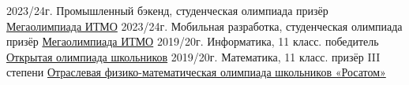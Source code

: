 \documentclass[9pt]{developercv} %
\begin{document}
\vspace{-20 pt}
\begin{entrylist}
    \entry
        {2023/24г.}
        {Промышленный бэкенд, студенческая олимпиада}
        {призёр}
        {\href{https://drive.google.com/file/d/1YQdVSubT0tgrUXBRzmaYQZjn4SfmLXu-/view}{Мегаолимпиада ИТМО}}
    \entry
        {2023/24г.}
        {Мобильная разработка, студенческая олимпиада}
        {призёр}
        {\href{https://drive.google.com/file/d/1yrZl55YZbbO_mYd815QeP8cv3__eWc_P/view}{Мегаолимпиада ИТМО}}
    \entry
		{2019/20г.}
        {Информатика, 11 класс.}
        {победитель}
        {\href{https://diploma.rsr-olymp.ru/files/rsosh-diplomas-static/compiled-storage-2020/by-code/184635984832/color.pdf}{Открытая олимпиада школьников}}
    \entry
		{2019/20г.}
        {Математика, 11 класс.}
        {призёр III степени}
		{\href{https://diploma.rsr-olymp.ru/files/rsosh-diplomas-static/compiled-storage-2020/by-code/186308281722/color.pdf}{Отраслевая физико-математическая олимпиада школьников «Росатом»}}
\end{entrylist}




\vspace{-10 pt}
\end{document}
